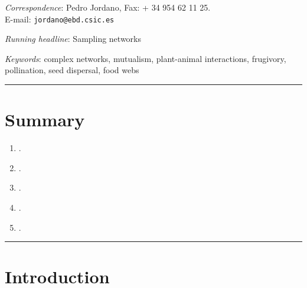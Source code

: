 
\def\mytitle{Sampling networks of ecological interactions}
\def\myauthor{Pedro Jordano      }
\def\latexaffiliation{Integrative Ecology Group, Estación Biológica de Doñana, Consejo Superior de Investigaciones Científicas (EBD-CSIC), Avenida Americo Vespucio s\slash n, E-41092 Sevilla, Spain}
\def\mydate{August 28, 2015}
\def\latexmode{memoir}
\def\email{jordano@ebd.csic.es}
\def\format{complete}
\def\latexxslt{xhtml2latex.xslt}
\def\bibliocommand{}
\def\bibliographytitle{Bibliography}
\def\bibliostyle{bes}



\emph{Correspondence}: Pedro Jordano, Fax: + 34 954 62 11 25.\\
E-mail: \texttt{jordano@ebd.csic.es} 

\emph{Running headline}: Sampling networks 

\emph{Keywords}: complex networks, mutualism, plant-animal interactions, frugivory, pollination, seed dispersal, food webs 

\begin{center}\rule{3in}{0.4pt}\end{center}


\section{Summary}
\label{summary}

\begin{enumerate}
\item .

\item .

\item .

\item .

\item .

\end{enumerate}

\begin{center}\rule{3in}{0.4pt}\end{center}


\section{Introduction}
\label{introduction}

